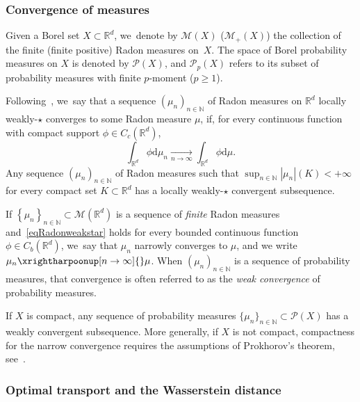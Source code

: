 \documentclass[10pt]{amsart}
\theoremstyle{definition}
\newcommand{\RR}{\mathbb{R}}
\newcommand\dd{\mathrm{d}}
\newcommand{\abs}[1]{\left\lvert#1\right\rvert}
\begin{document}
\subsubsection{Convergence of measures}
Given a Borel set $X\subset \RR^d$, we~denote by $\mathcal{M}(X)$ (\resp $\mathcal{M}_+(X)$) the collection of the finite (\resp finite positive) Radon measures on~$X$.
The space of Borel probability measures on $X$ is denoted by $\mathcal{P}(X)$, and $\mathcal{P}_p(X)$ refers to its subset of probability measures with finite $p$-moment ($p\ge 1$).

Following~\cite{ambrosio2000functions}, we~say that a sequence $\left(\mu_n\right)_{n \in \mathbb{N}}$ of Radon measures on $\RR^d$ locally weakly-$\star$ converges to some Radon measure $\mu$, if, for every continuous function with compact support $\phi \in C_c(\RR^d)$,
\begin{equation}\label{eqRadonweakstar}
\int_{\RR^d} \phi \dd \mu_n
\xrightarrow[n \to \infty]{}
\int_{\RR^d} \phi \dd \mu.
\end{equation}
Any sequence $(\mu_n)_{n\in\mathbb{N}}$ of Radon measures such that $\sup_{n\in\mathbb{N}} \abs{\mu_n}(K)<+\infty$ for every compact set $K\subset \RR^d$ has a locally weakly-$\star$ convergent subsequence.

If $\left\{\mu_n\right\}_{n \in \mathbb{N}}\subset \mathcal{M}(\RR^d)$ is a sequence of \emph{finite} Radon measures and~\eqref{eqRadonweakstar} holds for every bounded continuous function $\phi\in C_b(\RR^d)$, we~say that $\mu_n$ narrowly converges to $\mu$, and we write $\mu_n \xrightharpoonup[n \to \infty]{} \mu$. When $(\mu_n)_{n\in\mathbb{N}}$ is a sequence of probability measures, that convergence is often referred to as the \emph{weak convergence} of probability measures.

If $X$ is compact, any sequence of probability measures $\{\mu_n\}_{n\in\mathbb{N}}\subset \mathcal{P}(X)$ has a weakly convergent subsequence.
More generally, if $X$ is not compact, compactness for the narrow convergence requires the assumptions of Prokhorov's theorem,
see~\hbox{\cite[Th.\,2.8]{ambrosio2021lectures}}.

\subsubsection{Optimal transport and the Wasserstein distance}
\label{sec:wasserstein}
\end{document}

